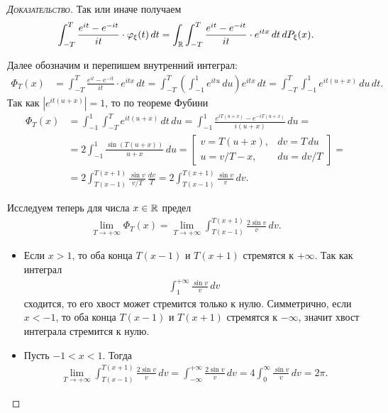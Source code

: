 \documentclass[../main.tex]{subfiles}
\begin{document}
\begin{proof}[\normalfont\textsc{Доказательство}]
 Так или иначе получаем
 \begin{align*}
  \int_{-T}^{T} \frac{e^{it}-e^{-it}}{it} \cdot \varphi_\xi(t)\,dt = \int_{\mathbb{R}} \int_{-T}^{T} \frac{e^{it}-e^{-it}}{it}  \cdot e^{itx}\,dt\,dP_\xi(x).
 \end{align*}

 Далее обозначим и перепишем внутренний интеграл:
 \begin{align*}
  \Phi_T(x) &= \int_{-T}^{T} \frac{e^{it}-e^{-it}}{it} \cdot e^{itx}\,dt = \int_{-T}^{T} \left(\int_{-1}^{1} e^{itu}\,du \right) e^{itx}\,dt = \int_{-T}^{T} \int_{-1}^{1} e^{it(u+x)}\,du\,dt.
 \end{align*} Так как $ \left| e^{it(u+x)} \right| = 1 $, то по теореме Фубини
 \begin{align*}
  \Phi_T(x) &= \int_{-1}^{1} \int_{-T}^{T} e^{it(u+x)}\,dt\,du = \int_{-1}^{1} \frac{e^{iT(u+x)}-e^{-iT(u+x)}}{i(u+x)}\,du = \\
  &= 2 \int_{-1}^{1} \frac{\sin(T(u+x))}{u+x}\,du = \begin{bmatrix}
   v = T(u+x), & dv = T\,du \\
   u = v / T - x, & du = dv / T
  \end{bmatrix} = \\
  &= 2 \int_{T(x-1)}^{T(x+1)} \frac{\sin v}{v / T}\,\frac{dv}{T} = 2 \int_{T(x-1)}^{T(x+1)}  \frac{\sin v}{v}\,dv.
 \end{align*}

 Исследуем теперь для числа $ x \in \mathbb{R} $ предел
 \begin{align*}
  \lim_{T \to +\infty}  \Phi_T(x) = \lim_{T \to +\infty} \int_{T(x-1)}^{T(x+1)}  \frac{2\sin v}{v}\,dv.
 \end{align*} 

 \begin{itemize}
  \item Если $x > 1$, то оба конца $ T(x - 1) $ и $ T(x+1) $ стремятся к $ +\infty $. Так как интеграл
   \begin{align*}
    \int_{1}^{+\infty} \frac{\sin v}{v}\,dv
   \end{align*} сходится, то его хвост может стремится только к нулю. Симметрично, если $ x < -1 $, то оба конца $ T(x-1) $ и $ T(x+1) $ стремятся к $ -\infty $, значит хвост интеграла стремится к нулю.
  \item Пусть $-1 < x < 1 $. Тогда
   \begin{align*}
    \lim_{T \to +\infty} \int_{T(x-1)}^{T(x+1)}  \frac{2 \sin v}{v}\,dv = \int_{-\infty}^{+\infty} \frac{2\sin v}{v}\,dv = 4 \int_{0}^{\infty} \frac{\sin v}{v}\,dv = 2 \pi.
   \end{align*}


\end{itemize}
\end{proof}
\end{document}
